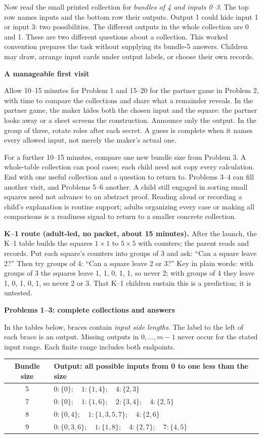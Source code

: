 \documentclass[11pt]{article}
\newcommand{\head}[1]{\par\textbf{\large #1}\par}
\newcommand{\sub}[1]{\par\textbf{#1}\par}
\begin{document}
Now read the small printed collection for \emph{bundles of 4 and inputs 0--3}. The top row names inputs and the bottom row their outputs. Output 1 could hide input 1 or input 3: two possibilities. The different outputs in the whole collection are 0 and 1. These are two different questions about a collection. This worked convention prepares the task without supplying its bundle-5 answers. Children may draw, arrange input cards under output labels, or choose their own records.

\sub{A manageable first visit}
Allow 10--15 minutes for Problem 1 and 15--20 for the partner game in Problem 2, with time to compare the collections and share what a remainder reveals. In the partner game, the maker hides both the chosen input and the square: the partner looks away or a sheet screens the construction. Announce only the output. In the group of three, rotate roles after each secret. A guess is complete when it names every allowed input, not merely the maker's actual one.

For a further 10--15 minutes, compare one new bundle size from Problem 3. A whole-table collection can pool cases; each child need not copy every calculation. End with one useful collection and a question to return to. Problems 3--4 can fill another visit, and Problems 5--6 another. A child still engaged in sorting small squares need not advance to an abstract proof. Reading aloud or recording a child's explanation is routine support; adults organizing every case or making all comparisons is a readiness signal to return to a smaller concrete collection.

\textbf{K--1 route (adult-led, no packet, about 15 minutes).} After the launch, the K--1 table builds the squares $1\times1$ to $5\times5$ with counters; the parent reads and records. Put each square's counters into groups of 3 and ask: ``Can a square leave 2?'' Then try groups of 4: ``Can a square leave 2 or 3?'' Key in plain words: with groups of 3 the squares leave 1, 1, 0, 1, 1, so never 2; with groups of 4 they leave 1, 0, 1, 0, 1, so never 2 or 3. That K--1 children sustain this is a prediction; it is untested.
\newpage
\head{Problems 1--3: complete collections and answers}
In the tables below, braces contain \emph{input side lengths}. The label to the left of each brace is an output. Missing outputs in $0,\ldots,m-1$ never occur for the stated input range. Each finite range includes both endpoints.

\begin{center}\renewcommand{\arraystretch}{1.25}
\begin{tabular}{c p{11.4cm}}
\toprule Bundle size & Output: all possible inputs from 0 to one less than the size\\\midrule
5 & $0:\{0\};\quad1:\{1,4\};\quad4:\{2,3\}$\\
7 & $0:\{0\};\quad1:\{1,6\};\quad2:\{3,4\};\quad4:\{2,5\}$\\
8 & $0:\{0,4\};\quad1:\{1,3,5,7\};\quad4:\{2,6\}$\\
9 & $0:\{0,3,6\};\quad1:\{1,8\};\quad4:\{2,7\};\quad7:\{4,5\}$\\\bottomrule
\end{tabular}\end{center}
\end{document}
